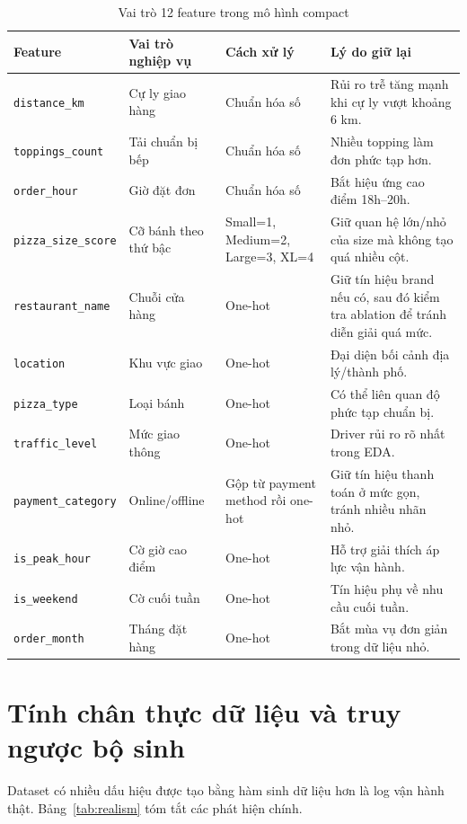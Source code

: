\documentclass[12pt,a4paper,oneside]{report}
\renewcommand{\arraystretch}{1.18}
\newcommand{\code}[1]{\nolinkurl{#1}}
\begin{document}
\begin{table}[H]
\centering\scriptsize
\renewcommand{\arraystretch}{1.18}
\caption{Vai trò 12 feature trong mô hình compact}
\begin{tabularx}{\textwidth}{p{3.2cm}p{3.7cm}p{3.4cm}X}
\toprule
Feature & Vai trò nghiệp vụ & Cách xử lý & Lý do giữ lại\\
\midrule
\code{distance\_km} & Cự ly giao hàng & Chuẩn hóa số & Rủi ro trễ tăng mạnh khi cự ly vượt khoảng 6 km.\\
\code{toppings\_count} & Tải chuẩn bị bếp & Chuẩn hóa số & Nhiều topping làm đơn phức tạp hơn.\\
\code{order\_hour} & Giờ đặt đơn & Chuẩn hóa số & Bắt hiệu ứng cao điểm 18h--20h.\\
\code{pizza\_size\_score} & Cỡ bánh theo thứ bậc & Small=1, Medium=2, Large=3, XL=4 & Giữ quan hệ lớn/nhỏ của size mà không tạo quá nhiều cột.\\
\code{restaurant\_name} & Chuỗi cửa hàng & One-hot & Giữ tín hiệu brand nếu có, sau đó kiểm tra ablation để tránh diễn giải quá mức.\\
\code{location} & Khu vực giao & One-hot & Đại diện bối cảnh địa lý/thành phố.\\
\code{pizza\_type} & Loại bánh & One-hot & Có thể liên quan độ phức tạp chuẩn bị.\\
\code{traffic\_level} & Mức giao thông & One-hot & Driver rủi ro rõ nhất trong EDA.\\
\code{payment\_category} & Online/offline & Gộp từ payment method rồi one-hot & Giữ tín hiệu thanh toán ở mức gọn, tránh nhiều nhãn nhỏ.\\
\code{is\_peak\_hour} & Cờ giờ cao điểm & One-hot & Hỗ trợ giải thích áp lực vận hành.\\
\code{is\_weekend} & Cờ cuối tuần & One-hot & Tín hiệu phụ về nhu cầu cuối tuần.\\
\code{order\_month} & Tháng đặt hàng & One-hot & Bắt mùa vụ đơn giản trong dữ liệu nhỏ.\\
\bottomrule
\end{tabularx}
\end{table}

\section{Tính chân thực dữ liệu và truy ngược bộ sinh}

Dataset có nhiều dấu hiệu được tạo bằng hàm sinh dữ liệu hơn là log vận hành
thật. Bảng~\ref{tab:realism} tóm tắt các phát hiện chính.
\end{document}
